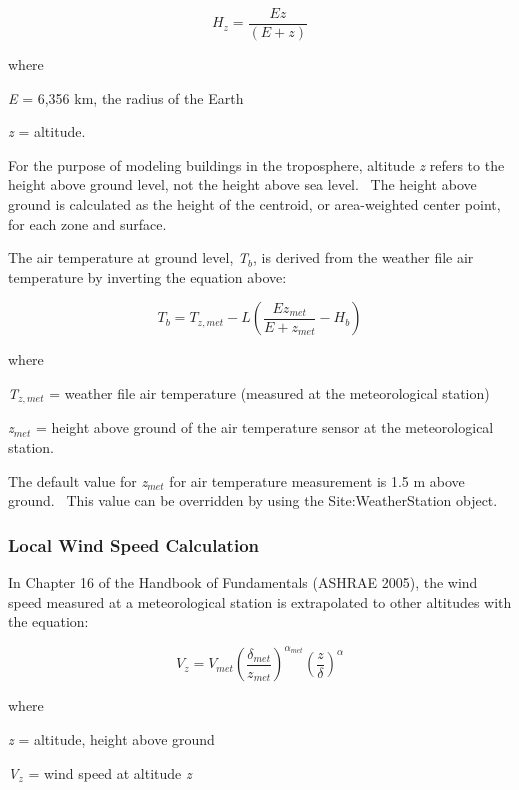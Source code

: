 \begin{equation}
{H_z} = \frac{{Ez}}{{\left( {E + z} \right)}}
\end{equation}

where

\emph{E} = 6,356 km, the radius of the Earth

\emph{z} = altitude.

For the purpose of modeling buildings in the troposphere, altitude \emph{z} refers to the height above ground level, not the height above sea level.~ The height above ground is calculated as the height of the centroid, or area-weighted center point, for each zone and surface.

The air temperature at ground level, \emph{T\(_{b}\)}, is derived from the weather file air temperature by inverting the equation above:

\begin{equation}
{T_b} = {T_{z,met}} - L\left( {\frac{{E{z_{met}}}}{{E + {z_{met}}}} - {H_b}} \right)
\end{equation}

where

\emph{T\(_{z,met}\)} = weather file air temperature (measured at the meteorological station)

\emph{z\(_{met}\)} = height above ground of the air temperature sensor at the meteorological station.

The default value for \emph{z\(_{met}\)} for air temperature measurement is 1.5 m above ground.~ This value can be overridden by using the Site:WeatherStation object.

\subsubsection{Local Wind Speed Calculation}\label{local-wind-speed-calculation}

In Chapter 16 of the Handbook of Fundamentals (ASHRAE 2005), the wind speed measured at a meteorological station is extrapolated to other altitudes with the equation:

\begin{equation}
{V_z} = {V_{met}}{\left( {\frac{{{\delta_{met}}}}{{{z_{met}}}}} \right)^{{\alpha_{met}}}}{\left( {\frac{z}{\delta }} \right)^\alpha }
\end{equation}

where

\emph{z} = altitude, height above ground

\emph{V\(_{z}\)} = wind speed at altitude \emph{z}

